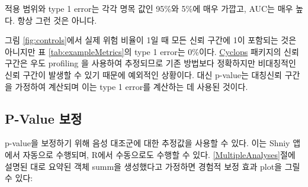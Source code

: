 \documentclass[10.5pt]{book}
\newenvironment{Shaded}{\begin{snugshade}}{\end{snugshade}}
\newcommand{\KeywordTok}[1]{\textcolor[rgb]{0.13,0.29,0.53}{\textbf{#1}}}
\newcommand{\DataTypeTok}[1]{\textcolor[rgb]{0.13,0.29,0.53}{#1}}
\newcommand{\StringTok}[1]{\textcolor[rgb]{0.31,0.60,0.02}{#1}}
\newcommand{\CommentTok}[1]{\textcolor[rgb]{0.56,0.35,0.01}{\textit{#1}}}
\newcommand{\OtherTok}[1]{\textcolor[rgb]{0.56,0.35,0.01}{#1}}
\newcommand{\OperatorTok}[1]{\textcolor[rgb]{0.81,0.36,0.00}{\textbf{#1}}}
\newcommand{\NormalTok}[1]{#1}
\theoremstyle{definition}
\theoremstyle{definition}
\theoremstyle{definition}
\theoremstyle{remark}
\begin{document}
적용 범위와 type 1 error는 각각 명목 값인 95\%와 5\%에 매우 가깝고,
AUC는 매우 높다. 항상 그런 것은 아니다.

그림 \ref{fig:controls}에서 실제 위험 비율이 1일 때 모든 신뢰 구간에 1이
포함되는 것은 아니지만 표 \ref{tab:exampleMetrics}의 type 1 error는
0\%이다. \href{https://ohdsi.github.io/Cyclops/}{Cyclops} 패키지의 신뢰
구간은 우도 profiling 을 사용하여 추정되므로 기존 방법보다 정확하지만
비대칭적인 신뢰 구간이 발생할 수 있기 때문에 예외적인 상황이다. 대신
p-value는 대칭신뢰 구간을 가정하여 계산되며 이는 type 1 error를 계산하는
데 사용된 것이다.

\subsection{P-Value 보정}\label{p-value--1}

p-value을 보정하기 위해 음성 대조군에 대한 추정값을 사용할 수 있다. 이는
Shniy 앱에서 자동으로 수행되며, R에서 수동으로도 수행할 수 있다.
\ref{MultipleAnalyses}절에 설명된 대로 요약된 객체 summ을 생성했다고
가정하면 경험적 보정 효과 plot을 그릴 수 있다:

\begin{Shaded}
\end{Shaded}
\end{document}
